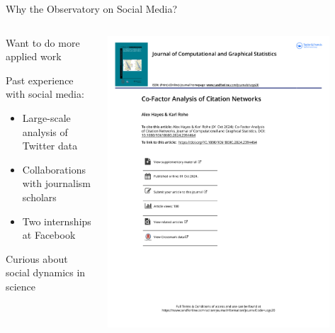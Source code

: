 \documentclass[aspectratio=169]{beamer}
\theoremstyle{remark}
\begin{document}
\begin{frame}{Why the Observatory on Social Media?}
    \vfill
    \begin{columns}
        \begin{column}{0.5\textwidth}
            Want to do more applied work \\
            \vspace{5mm}
            
            Past experience with social media:
            \begin{itemize}
                \item Large-scale analysis of Twitter data
                \item Collaborations with journalism scholars
                \item Two internships at Facebook
            \end{itemize}
            
            \vspace{4mm}
            Curious about social dynamics in science
        \end{column}
        \begin{column}{0.5\textwidth}
            \centering
            \includegraphics[width=0.87\textwidth, page=2]{citations.pdf}
        \end{column}
    \end{columns}
\end{frame}
\end{document}
